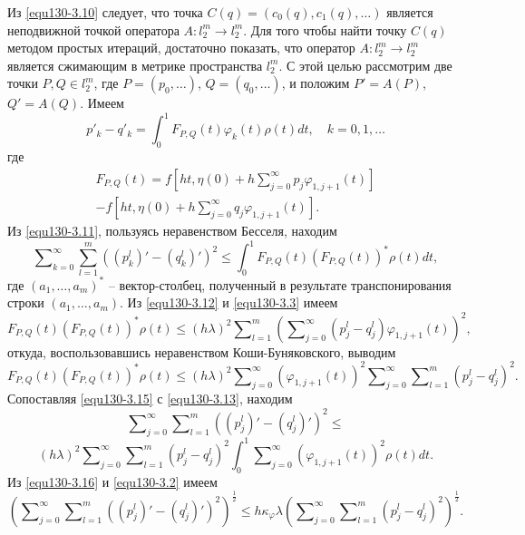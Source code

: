 Из  \eqref{equ130-3.10} следует, что точка $C(q)=(c_0(q),c_1(q),\ldots)$ является неподвижной точкой оператора $A:l_2^m\to l_2^m$. Для того чтобы найти точку $C(q)$ методом простых итераций, достаточно показать, что оператор $A:l_2^m\to l_2^m$ является сжимающим в метрике пространства $l_2^m$. С этой целью рассмотрим две точки $P,Q\in l_2^m$, где $P=(p_0,\ldots)$, $Q=(q_0,\ldots)$, и положим $P'=A(P)$, $Q'=A(Q)$. Имеем
\begin{equation}\label{equ130-3.11}
p'_k-q'_k=\int_{0}^1F_{P,Q}(t)\varphi_k(t)\rho(t)dt,\quad k=0,1,\ldots
\end{equation}
где
\begin{multline}\label{equ130-3.12}
 F_{P,Q}(t)=f\left[ht,\eta(0)+ h\sum\nolimits_{j=0}^\infty p_j\varphi_{1,j+1}(t)\right] \\
  -f\left[ht,\eta(0)+ h\sum\nolimits_{j=0}^\infty q_j\varphi_{1,j+1}(t)\right].
\end{multline}
Из \eqref{equ130-3.11}, пользуясь неравенством Бесселя, находим
 \begin{equation}\label{equ130-3.13}
\sum\nolimits_{k=0}^\infty \sum_{l=1}^m((p^l_k)'-(q^l_k)')^2\le\int_{0}^1F_{P,Q}(t)(F_{P,Q}(t))^*\rho(t) dt,
\end{equation}
где $(a_1,\ldots,a_m)^*$ -- вектор-столбец, полученный в результате транспонирования строки $(a_1,\ldots,a_m)$.
Из \eqref{equ130-3.12} и \eqref{equ130-3.3}  имеем
 \begin{equation}\label{equ130-3.15}
F_{P,Q}(t)(F_{P,Q}(t))^*\rho(t)\le (h\lambda)^2 \sum\nolimits_{l=1}^m  \left(\sum\nolimits_{j=0}^\infty( p^l_j-q^l_j)\varphi_{1,j+1}(t)\right)^2,
\end{equation}
откуда,  воспользовавшись неравенством Коши-Буняковского, выводим
$$
F_{P,Q}(t)(F_{P,Q}(t))^*\rho(t)\le(h\lambda)^2  \sum\nolimits_{j=0}^\infty(\varphi_{1,j+1}(t))^2 \sum\nolimits_{j=0}^\infty\sum\nolimits_{l=1}^m( p^l_j-q^l_j)^2.
$$
Сопоставляя \eqref{equ130-3.15} с \eqref{equ130-3.13}, находим
$$
\sum\nolimits_{j=0}^\infty\sum\nolimits_{l=1}^m((p^l_j)'-(q^l_j)')^2\le
$$
\begin{equation}\label{equ130-3.16}
(h\lambda)^2 \sum\nolimits_{j=0}^\infty\sum\nolimits_{l=1}^m( p^l_j-q^l_j)^2\int_{0}^1 \sum\nolimits_{j=0}^\infty(\varphi_{1,j+1}(t))^2\rho(t) dt.
\end{equation}
Из  \eqref{equ130-3.16}  и \eqref{equ130-3.2} имеем
\begin{equation}\label{equ130-3.17}
\left(\sum\nolimits_{j=0}^\infty\sum\nolimits_{l=1}^m((p^l_j)'-(q^l_j)')^2\right)^\frac12\le h\kappa_\varphi\lambda \left(\sum\nolimits_{j=0}^\infty\sum\nolimits_{l=1}^m( p^l_j-q^l_j)^2\right)^\frac12.
\end{equation}
